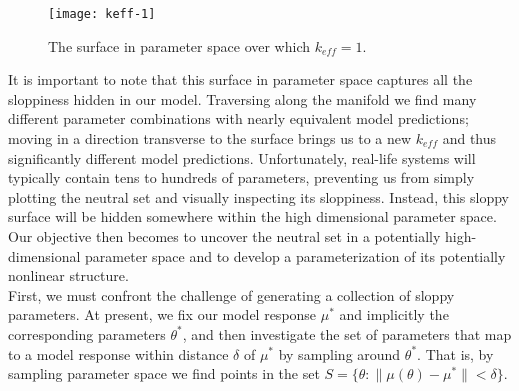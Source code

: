 \documentclass{article}
\newcommand{\ssep}{:}
\newcommand{\omr}{\mu}
\begin{document}
\begin{figure}[htbp]
  \centering
  \texttt{[image: keff-1]}
  \caption{The surface in parameter space over which $k_{eff} = 1$. \label{fig:qssa:sloppy-manifold}}
\end{figure}


It is important to note that this surface in parameter space captures
all the sloppiness hidden in our model. Traversing along the manifold we
find many different parameter combinations with nearly equivalent
model predictions; moving in a direction transverse to the surface
brings us to a new $k_{eff}$ and thus significantly different model
predictions. Unfortunately, real-life systems will typically contain
tens to hundreds of parameters, preventing us from simply plotting the
neutral set and visually inspecting its sloppiness. Instead, this
sloppy surface will be hidden somewhere within the high dimensional
parameter space. Our objective then becomes to uncover the neutral set
in a potentially high-dimensional parameter space and to develop a
parameterization of its potentially nonlinear structure. \\


First, we must confront the challenge of generating a collection of
sloppy parameters. At present, we fix our model response $\omr^*$ and
implicitly the corresponding parameters $\theta^*$, and then
investigate the set of parameters that map to a model response within
distance $\delta$ of $\omr^*$ by sampling around $\theta^*$. That is,
by sampling parameter space we find points in the set
$S = \{\theta \ssep  \| \omr(\theta) - \omr^* \| < \delta \}$. \\
\end{document}
